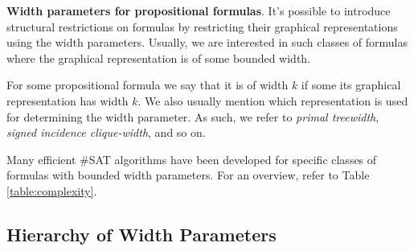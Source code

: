 \documentclass{article}
\begin{document}
\noindent
\textbf{Width parameters for propositional formulas}.
It's possible to introduce structural restrictions on formulas by restricting their graphical representations using the width parameters.
Usually, we are interested in such classes of formulas where the graphical representation is of some bounded width.

For some propositional formula we say that it is of width $k$ if some its graphical representation has width $k$.
We also usually mention which representation is used for determining the width parameter. As such, we refer to {\em primal treewidth}, {\em signed incidence clique-width}, and so on.

Many efficient \#SAT algorithms have been developed for specific classes of formulas with bounded width parameters.
For an overview, refer to Table \ref{table:complexity}.

\subsection{Hierarchy of Width Parameters}





\end{document}
